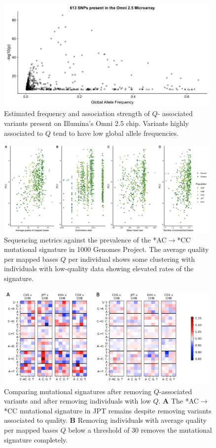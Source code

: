 \documentclass[9pt,article]{template}
\begin{document}
\begin{figure}[tbp]
\includegraphics[width=11cm,keepaspectratio]{../Figures/Omni_AF.jpg}
\caption{Estimated frequency and association strength of $Q$- associated variants present on Illumina's Omni 2.5 chip. Variants highly associated to $Q$ tend to have low global allele frequencies.}
\label{Omni}
\end{figure}

\begin{figure}[tbp]
\includegraphics[width=11cm,keepaspectratio]{../Figures/PC1_Correlation.jpg}
\caption{Sequencing metrics against the prevalence of the  *AC${\rightarrow}$*CC mutational signature in 1000 Genomes Project. 
The average quality per mapped bases $Q$ per individual shows some clustering with individuals with low-quality data showing elevated rates of the signature.  }
\label{PC1_Correlation}
\end{figure}

\begin{figure}[tbp]
\includegraphics[width=11cm,keepaspectratio]{../Figures/MutationSpectrum_cutOff.png}
\caption{Comparing mutational signatures after removing $Q$-associated variants and after removing individuals with low $Q$.  
\textbf{A} 
The  *AC${\rightarrow}$*CC mutational signature in JPT remains despite removing variants associated to quality.
\textbf{B} 
Removing individuals with average quality per mapped bases $Q$ below a threshold of 30 removes the mutational signature completely. }
\label{MutSpect}
\end{figure}
\end{document}
